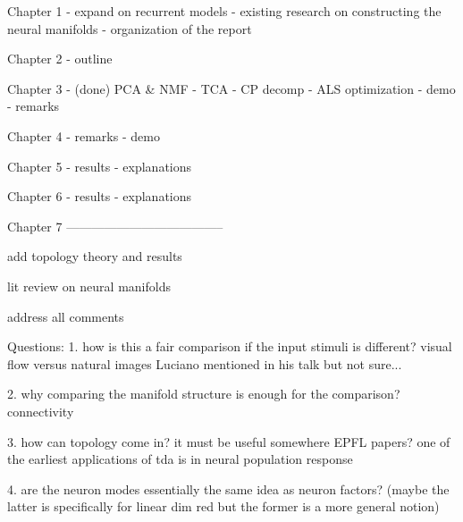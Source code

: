 
Chapter 1
- expand on recurrent models
- existing research on constructing the neural manifolds
- organization of the report

Chapter 2
- outline

Chapter 3
- (done) PCA & NMF 
- TCA 
- CP decomp
- ALS optimization
- demo 
- remarks 

Chapter 4
- remarks 
- demo

Chapter 5
- results
- explanations 

Chapter 6
- results 
- explanations 

Chapter 7
--------------------------------------

add topology theory and results

lit review on neural manifolds

address all comments

Questions:
1. how is this a fair comparison if the input stimuli is different? visual flow versus natural images
Luciano mentioned in his talk but not sure... 

2. why comparing the manifold structure is enough for the comparison? 
connectivity

3. how can topology come in? it must be useful somewhere EPFL papers? 
one of the earliest applications of tda is in neural population response 


4. are the neuron modes essentially the same idea as neuron factors? (maybe the latter is specifically for linear dim red but the former is a more general notion)